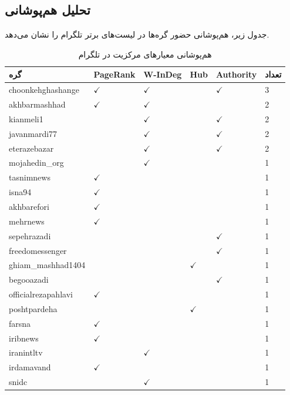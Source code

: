 \documentclass{article}
\begin{document}
	
	
	
	\subsection{تحلیل هم‌پوشانی}
	جدول زیر، هم‌پوشانی حضور گره‌ها در لیست‌های برتر تلگرام را نشان می‌دهد.
	
	\begin{table}[h!]
		\centering
		\caption{هم‌پوشانی معیارهای مرکزیت در تلگرام}
		\label{tab:telegram_overlap}
		\begin{tabular}{@{}llllll@{}}
			\toprule
			\textbf{گره} & \textbf{PageRank} & \textbf{W-InDeg} & \textbf{Hub} & \textbf{Authority} & \textbf{تعداد} \\ \midrule
			choonkehghashange & $\checkmark$ & $\checkmark$ &  & $\checkmark$ & 3 \\
			akhbarmashhad & $\checkmark$ & $\checkmark$ &  &  & 2 \\
			kianmeli1 &  & $\checkmark$ &  & $\checkmark$ & 2 \\
			javanmardi77 &  & $\checkmark$ &  & $\checkmark$ & 2 \\
			eterazebazar &  & $\checkmark$ &  & $\checkmark$ & 2 \\
			mojahedin\_org &  & $\checkmark$ &  &  & 1 \\
			tasnimnews & $\checkmark$ &  &  &  & 1 \\
			isna94 & $\checkmark$ &  &  &  & 1 \\
			akhbarefori & $\checkmark$ &  &  &  & 1 \\
			mehrnews & $\checkmark$ &  &  &  & 1 \\
			sepehrazadi &  &  &  & $\checkmark$ & 1 \\
			freedomessenger &  &  &  & $\checkmark$ & 1 \\
			ghiam\_mashhad1404 &  &  & $\checkmark$ &  & 1 \\
			begooazadi &  &  &  & $\checkmark$ & 1 \\
			officialrezapahlavi & $\checkmark$ &  &  &  & 1 \\
			poshtpardeha &  &  & $\checkmark$ &  & 1 \\
			farsna & $\checkmark$ &  &  &  & 1 \\
			iribnews & $\checkmark$ &  &  &  & 1 \\
			iranintltv &  & $\checkmark$ &  &  & 1 \\
			irdamavand & $\checkmark$ &  &  &  & 1 \\
			snidc &  & $\checkmark$ &  &  & 1 \\

\end{tabular}
\end{table}
\end{document}
